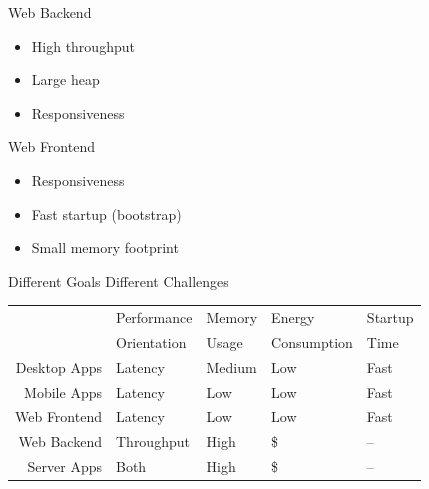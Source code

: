 \documentclass[
14pt,
aspectratio=169,
usenames,
dvipsnames,
x11names]{beamer}
\begin{document}
\begin{frame}{Web Backend}
  \begin{itemize}  \setlength{\itemsep}{\fill}
  \item High throughput
  \item Large heap
  \item Responsiveness
  \end{itemize}
\end{frame}

\begin{frame}{Web Frontend}
  \begin{itemize}  \setlength{\itemsep}{\fill}
  \item Responsiveness
  \item Fast startup (bootstrap)
  \item Small memory footprint
  \end{itemize}
\end{frame}

\begin{frame}{Different Goals Different Challenges}
  \centering
  \begin{tabular}{r | l l l l}
                 & Performance & Memory & Energy      & Startup \\
                 & Orientation & Usage  & Consumption & Time    \\
    \hline
    Desktop Apps & Latency     & Medium & Low         & Fast    \\
    Mobile Apps  & Latency     & Low    & Low         & Fast    \\
    Web Frontend & Latency     & Low    & Low         & Fast    \\
    Web Backend  & Throughput  & High   & \$          & --      \\
    Server Apps  & Both        & High   & \$          & --      \\
  \end{tabular}
\end{frame}


\end{document}
